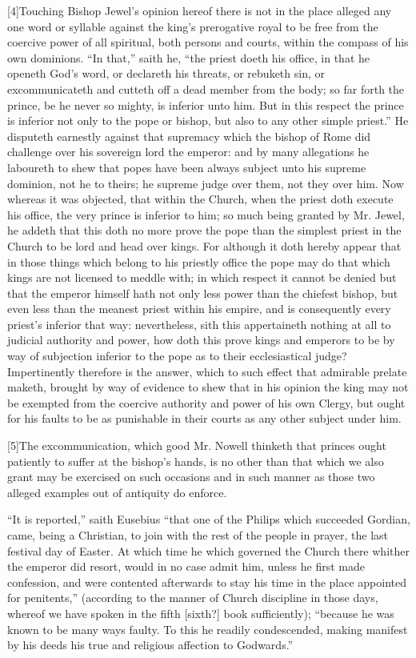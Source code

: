 [4]Touching Bishop Jewel’s opinion hereof there is not in the place alleged any one word or syllable against the king’s prerogative royal to be free from the coercive power of all spiritual, both persons and courts, within the compass of his own dominions. “In that,” saith he, “the priest doeth his office, in that he openeth God’s word, or declareth his threats, or rebuketh sin, or excommunicateth and cutteth off a dead member from the body; so far forth the prince, be he never so mighty, is inferior unto him. But in this respect the prince is inferior not only to the pope or bishop, but also to any other simple priest.” He disputeth earnestly against that supremacy which the bishop of Rome did challenge over his sovereign lord the emperor: and by many allegations he laboureth to shew that popes have been always subject unto his supreme dominion, not he to theirs; he supreme judge over them, not they over him. Now whereas it was objected, that within the Church, when the priest doth execute his office, the very prince is inferior to him; so much being granted by Mr. Jewel, he addeth that this doth no more prove the pope than the simplest priest in the Church to be lord and head over kings. For although it doth hereby appear that in those things which belong to his priestly office the pope may do that which kings are not licensed to meddle with; in which respect it cannot be denied but that the emperor himself hath not only less power than the chiefest bishop, but even less than the meanest priest within his empire, and is consequently every priest’s inferior that way: nevertheless, sith this appertaineth nothing at all to judicial authority and power, how doth this prove kings and emperors to be by way of subjection inferior to the pope as to their ecclesiastical judge? Impertinently therefore is the answer,  which to such effect that admirable prelate maketh, brought by way of evidence to shew that in his opinion the king may not be exempted from the coercive authority and power of his own Clergy, but ought for his faults to be as punishable in their courts as any other subject under him.

[5]The excommunication, which good Mr. Nowell thinketh that princes ought patiently to suffer at the bishop’s hands, is no other than that which we also grant may be exercised on such occasions and in such manner as those two alleged examples out of antiquity do enforce.

“It is reported,” saith Eusebius “that one of the Philips which succeeded Gordian, came, being a Christian, to join with the rest of the people in prayer, the last festival day of Easter. At which time he which governed the Church there whither the emperor did resort, would in no case admit him, unless he first made confession, and were contented afterwards to stay his time in the place appointed for penitents,” (according to the manner of Church discipline in those days, whereof we have spoken in the fifth [sixth?] book sufficiently); “because he was known to be many ways faulty. To this he readily condescended, making manifest by his deeds his true and religious affection to Godwards.”

